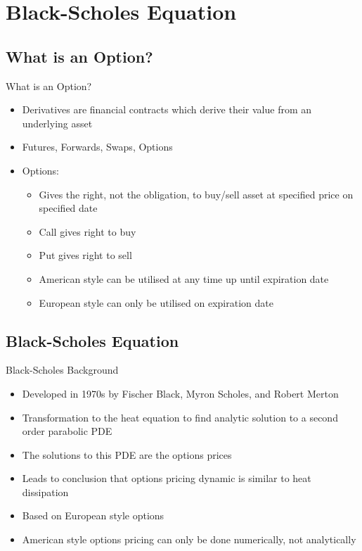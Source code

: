 \section{Black-Scholes Equation}

\subsection{What is an Option?}

\begin{frame}{What is an Option?}
    \begin{itemize}
        \item Derivatives are financial contracts which derive their value from an underlying asset
        \item Futures, Forwards, Swaps, Options
        \item Options:
        \begin{itemize}
            \item Gives the right, not the obligation, to buy/sell asset at specified price on specified date
            \item Call gives right to buy
            \item Put gives right to sell
            \item American style can be utilised at any time up until expiration date
            \item European style can only be utilised on expiration date
        \end{itemize}
    \end{itemize}
\end{frame}

\subsection{Black-Scholes Equation}

\begin{frame}{Black-Scholes Background}
    \begin{itemize}
        \item Developed in 1970s by Fischer Black, Myron Scholes, and Robert Merton
        \item Transformation to the heat equation to find analytic solution to a second order parabolic PDE
        \item The solutions to this PDE are the options prices
        \item Leads to conclusion that options pricing dynamic is similar to heat dissipation
        \item Based on European style options
        \item American style options pricing can only be done numerically, not analytically
    \end{itemize}
\end{frame}

